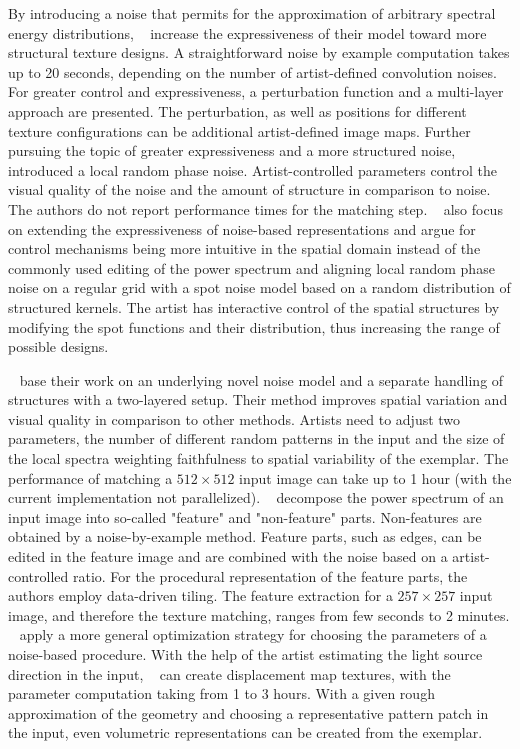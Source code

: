 By introducing a noise that permits for the approximation of arbitrary spectral energy distributions, \citeauthor*{gilet_2012_mkn}~\cite{gilet_2012_mkn} increase the expressiveness of their model toward more structural texture designs. A straightforward noise by example computation takes up to 20 seconds, depending on the number of artist-defined convolution noises. For greater control and expressiveness, a perturbation function and a multi-layer approach are presented. The perturbation, as well as positions for different texture configurations can be additional artist-defined image maps. Further pursuing the topic of greater expressiveness and a more structured noise, \citeauthor*{gilet_2014_lrn}~\cite{gilet_2014_lrn} introduced a local random phase noise. Artist-controlled parameters control the visual quality of the noise and the amount of structure in comparison to noise. The authors do not report performance times for the matching step. \citeauthor*{pavie_2016_pts}~\cite{pavie_2016_pts} also focus on extending the expressiveness of noise-based representations and argue for control mechanisms being more intuitive in the spatial domain instead of the commonly used editing of the power spectrum and aligning local random phase noise on a regular grid with a spot noise model based on a random distribution of structured kernels. The artist has interactive control of the spatial structures by modifying the spot functions and their distribution, thus increasing the range of possible designs.

\citeauthor*{guingo_2017_btm}~\cite{guingo_2017_btm} base their work on an underlying novel noise model and a separate handling of structures with a two-layered setup. Their method improves spatial variation and visual quality in comparison to other methods. Artists need to adjust two parameters, the number of different random patterns in the input and the size of the local spectra weighting faithfulness to spatial variability of the exemplar. The performance of matching a $512\times512$ input image can take up to 1 hour (with the current implementation not parallelized). \citeauthor*{kang_2017_fpt}~\cite{kang_2017_fpt} decompose the power spectrum of an input image into so-called "feature" and "non-feature" parts. Non-features are obtained by a noise-by-example method. Feature parts, such as edges, can be edited in the feature image and are combined with the noise based on a artist-controlled ratio. For the procedural representation of the feature parts, the authors employ data-driven tiling. The feature extraction for a $257\times257$ input image, and therefore the texture matching, ranges from few seconds to 2 minutes. \citeauthor*{gilet_2010_ias}~\cite{gilet_2010_ias} apply a more general optimization strategy for choosing the parameters of a noise-based procedure. With the help of the artist estimating the light source direction in the input, \citeauthor*{gilet_2010_ias}~\cite{gilet_2010_ias} can create displacement map textures, with the parameter computation taking from 1 to 3 hours. With a given rough approximation of the geometry and choosing a representative pattern patch in the input, even volumetric representations can be created from the exemplar.

